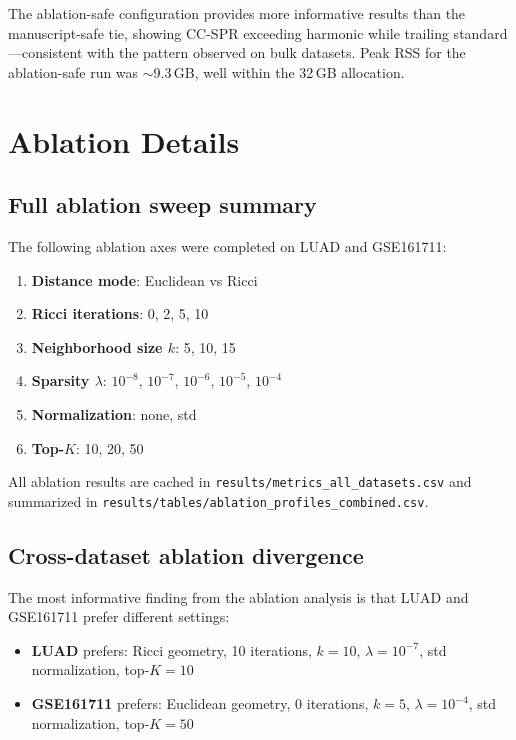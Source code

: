 \documentclass[11pt]{article}
\begin{document}
The ablation-safe configuration provides more informative results than the manuscript-safe tie, showing CC-SPR exceeding harmonic while trailing standard---consistent with the pattern observed on bulk datasets.
Peak RSS for the ablation-safe run was ${\sim}$9.3\,GB, well within the 32\,GB allocation.

\section{Ablation Details}

\subsection{Full ablation sweep summary}

The following ablation axes were completed on LUAD and GSE161711:
\begin{enumerate}[leftmargin=1.5em]
\item \textbf{Distance mode}: Euclidean vs Ricci
\item \textbf{Ricci iterations}: 0, 2, 5, 10
\item \textbf{Neighborhood size $k$}: 5, 10, 15
\item \textbf{Sparsity $\lambda$}: $10^{-8}$, $10^{-7}$, $10^{-6}$, $10^{-5}$, $10^{-4}$
\item \textbf{Normalization}: none, std
\item \textbf{Top-$K$}: 10, 20, 50
\end{enumerate}

All ablation results are cached in \texttt{results/metrics\_all\_datasets.csv} and summarized in \texttt{results/tables/ablation\_profiles\_combined.csv}.

\subsection{Cross-dataset ablation divergence}

The most informative finding from the ablation analysis is that LUAD and GSE161711 prefer different settings:
\begin{itemize}[leftmargin=1.5em]
\item \textbf{LUAD} prefers: Ricci geometry, 10 iterations, $k=10$, $\lambda=10^{-7}$, std normalization, top-$K=10$
\item \textbf{GSE161711} prefers: Euclidean geometry, 0 iterations, $k=5$, $\lambda=10^{-4}$, std normalization, top-$K=50$
\end{itemize}
\end{document}

